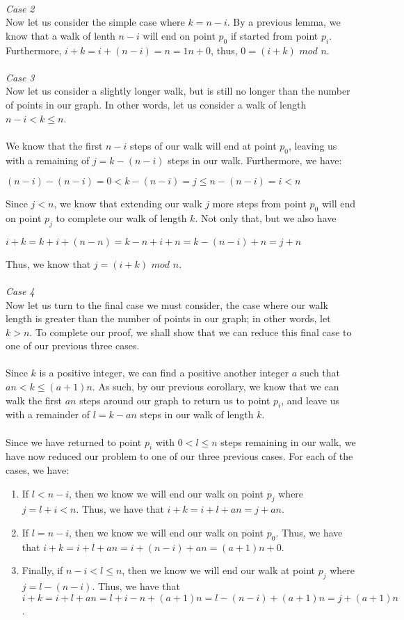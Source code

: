\documentclass[a4paper,12pt]{article}
\begin{document}
\\
\textit{Case 2}\\
Now let us consider the simple case where $k = n - i$. By a previous lemma, we know that a walk of lenth $n - i$ will end on point $p_0$ if started from point $p_i$. Furthermore, $i + k = i + (n - i) = n = 1n + 0$, thus, $0 = (i + k)$ $mod$ $n$.\\
\\
\textit{Case 3}\\
Now let us consider a slightly longer walk, but is still no longer than the number of points in our graph. In other words, let us consider a walk of length $n - i < k \leq n$.\\
\\
We know that the first $n - i$ steps of our walk will end at point $p_0$, leaving us with a remaining of $j = k - (n - i)$ steps in our walk. Furthermore, we have:
\begin{center}
$(n - i) - (n - i) = 0 < k - (n - i) = j \leq n - (n - i) = i < n$ 
\end{center}
Since $j < n$, we know that extending our walk $j$ more steps from point $p_0$ will end on point $p_j$ to complete our walk of length $k$. Not only that, but we also have
\begin{center}
$i + k = k + i + (n - n) = k - n + i + n = k - (n - i) + n = j + n$
\end{center} 
Thus, we know that $j = (i + k)$ $mod$ $n$.\\
\\
\textit{Case 4}\\
Now let us turn to the final case we must consider, the case where our walk length is greater than the number of points in our graph; in other words, let $k > n$. To complete our proof, we shall show that we can reduce this final case to one of our previous three cases.\\
\\
Since $k$ is a positive integer, we can find a positive another integer $a$ such that $an < k \leq (a + 1)n$. As such, by our previous corollary, we know that we can walk the first $an$ steps around our graph to return us to point $p_i$, and leave us with a remainder of $l = k - an$ steps in our walk of length $k$.\\
\\
Since we have returned to point $p_i$ with $0 < l \leq n$ steps remaining in our walk, we have now reduced our problem to one of our three previous cases. For each of the cases, we have:
\begin{enumerate}
\item If $l < n - i$, then we know we will end our walk on point $p_j$ where $j = l + i < n$. Thus, we have that $i + k = i + l + an = j + an$.
\item If $l = n - i$, then we know we will end our walk on point $p_0$. Thus, we have that $i + k = i + l + an = i + (n - i) + an = (a + 1)n + 0$.
\item Finally, if $n - i < l \leq n$, then we know we will end our walk at point $p_j$ where $j = l - (n - i)$. Thus, we have that $i + k = i + l + an = l + i - n + (a + 1)n = l - (n - i) + (a + 1)n = j + (a + 1)n$.
\end{enumerate}
\end{document}
